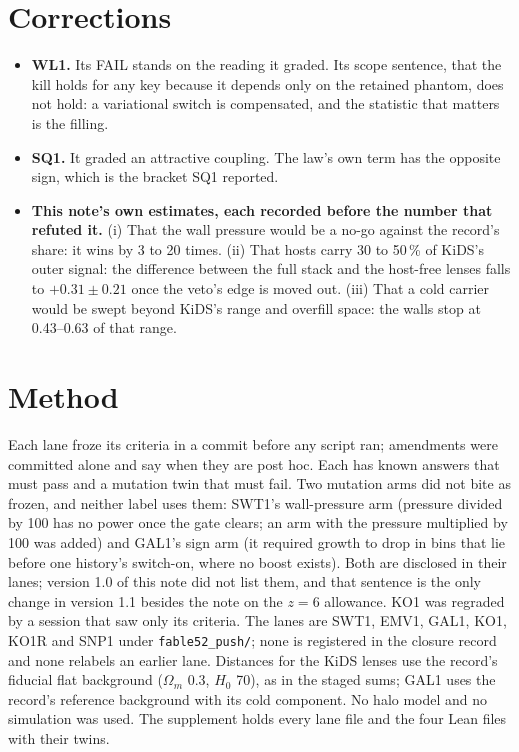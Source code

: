 \documentclass[10pt]{article}
\begin{document}
\section{Corrections}
\begin{itemize}
\item \textbf{WL1.} Its FAIL stands on the reading it graded. Its scope sentence, that the kill holds for any key because it depends only on the retained phantom, does not hold: a variational switch is compensated, and the statistic that matters is the filling.
\item \textbf{SQ1.} It graded an attractive coupling. The law's own term has the opposite sign, which is the bracket SQ1 reported.
\item \textbf{This note's own estimates, each recorded before the number that refuted it.} (i) That the wall pressure would be a no-go against the record's share: it wins by 3 to 20 times. (ii) That hosts carry 30 to 50\,\% of KiDS's outer signal: the difference between the full stack and the host-free lenses falls to $+0.31\pm0.21$ once the veto's edge is moved out. (iii) That a cold carrier would be swept beyond KiDS's range and overfill space: the walls stop at 0.43--0.63 of that range.
\end{itemize}

\section*{Method}
Each lane froze its criteria in a commit before any script ran; amendments were committed alone and say when they are post hoc. Each has known answers that must pass and a mutation twin that must fail. Two mutation arms did not bite as frozen, and neither label uses them: SWT1's wall-pressure arm (pressure divided by 100 has no power once the gate clears; an arm with the pressure multiplied by 100 was added) and GAL1's sign arm (it required growth to drop in bins that lie before one history's switch-on, where no boost exists). Both are disclosed in their lanes; version 1.0 of this note did not list them, and that sentence is the only change in version 1.1 besides the note on the $z=6$ allowance. KO1 was regraded by a session that saw only its criteria. The lanes are SWT1, EMV1, GAL1, KO1, KO1R and SNP1 under \texttt{fable52\_push/}; none is registered in the closure record and none relabels an earlier lane. Distances for the KiDS lenses use the record's fiducial flat background ($\Omega_m$ 0.3, $H_0$ 70), as in the staged sums; GAL1 uses the record's reference background with its cold component. No halo model and no simulation was used. The supplement holds every lane file and the four Lean files with their twins.
\end{document}
